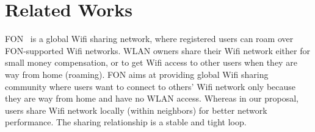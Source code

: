 \section{Related Works}
\label{sec:related}

FON~\cite{fon} is a global Wifi sharing network, where registered users can roam
over FON-supported Wifi networks. WLAN owners share their Wifi network either
for small money compensation, or to get Wifi access to other users when they are
way from home (roaming). FON aims at providing global Wifi sharing community
where users want to connect to others' Wifi network only because they are way
from home and have no WLAN access. Whereas in our proposal, users share Wifi
network locally (within neighbors) for better network performance. The sharing
relationship is a stable and tight loop.
